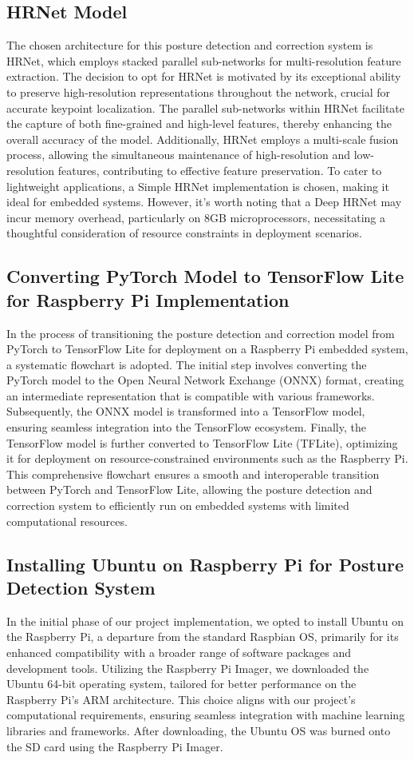 \documentclass{article}
\begin{document}
\subsection{HRNet Model}
The chosen architecture for this posture detection and correction system is HRNet, which employs stacked parallel sub-networks for multi-resolution feature extraction. The decision to opt for HRNet is motivated by its exceptional ability to preserve high-resolution representations throughout the network, crucial for accurate keypoint localization. The parallel sub-networks within HRNet facilitate the capture of both fine-grained and high-level features, thereby enhancing the overall accuracy of the model. Additionally, HRNet employs a multi-scale fusion process, allowing the simultaneous maintenance of high-resolution and low-resolution features, contributing to effective feature preservation. To cater to lightweight applications, a Simple HRNet implementation is chosen, making it ideal for embedded systems. However, it's worth noting that a Deep HRNet may incur memory overhead, particularly on 8GB microprocessors, necessitating a thoughtful consideration of resource constraints in deployment scenarios.

\subsection{Converting PyTorch Model to TensorFlow Lite for Raspberry Pi Implementation}
In the process of transitioning the posture detection and correction model from PyTorch to TensorFlow Lite for deployment on a Raspberry Pi embedded system, a systematic flowchart is adopted. The initial step involves converting the PyTorch model to the Open Neural Network Exchange (ONNX) format, creating an intermediate representation that is compatible with various frameworks. Subsequently, the ONNX model is transformed into a TensorFlow model, ensuring seamless integration into the TensorFlow ecosystem. Finally, the TensorFlow model is further converted to TensorFlow Lite (TFLite), optimizing it for deployment on resource-constrained environments such as the Raspberry Pi. This comprehensive flowchart ensures a smooth and interoperable transition between PyTorch and TensorFlow Lite, allowing the posture detection and correction system to efficiently run on embedded systems with limited computational resources.

\subsection{Installing Ubuntu on Raspberry Pi for Posture Detection System}
In the initial phase of our project implementation, we opted to install Ubuntu on the Raspberry Pi, a departure from the standard Raspbian OS, primarily for its enhanced compatibility with a broader range of software packages and development tools. Utilizing the Raspberry Pi Imager, we downloaded the Ubuntu 64-bit operating system, tailored for better performance on the Raspberry Pi's ARM architecture. This choice aligns with our project's computational requirements, ensuring seamless integration with machine learning libraries and frameworks. After downloading, the Ubuntu OS was burned onto the SD card using the Raspberry Pi Imager.
\end{document}
